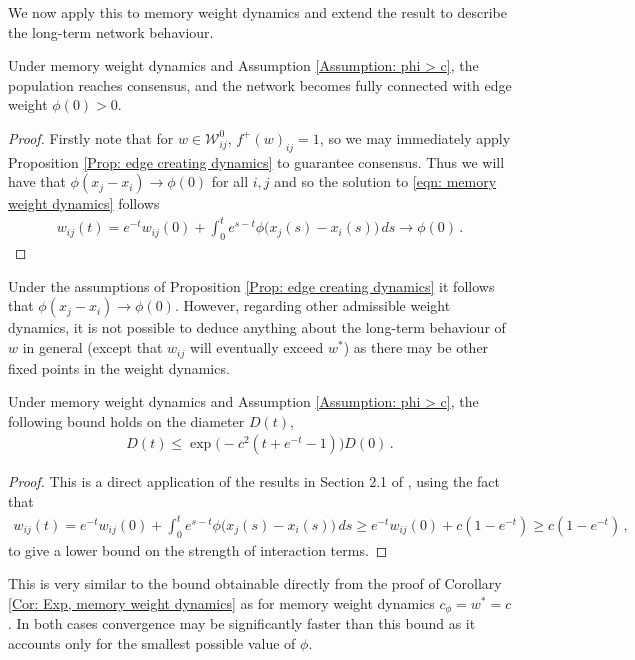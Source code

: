 \documentclass{article}
\begin{document}
We now apply this to memory weight dynamics and extend the result to describe the long-term network behaviour. 

\begin{corollary} \label{Cor: Exp, memory weight dynamics}
    Under memory weight dynamics and Assumption \ref{Assumption: phi > c}, the population reaches consensus, and the network becomes fully connected with edge weight $\phi(0)>0$.  
\end{corollary}
\begin{proof}
    Firstly note that for $w \in \mathcal{W}_{ij}^0$, $f^+(w)_{ij} = 1$, so we may immediately apply Proposition \ref{Prop: edge creating dynamics} to guarantee consensus. Thus we will have that $\phi(x_j - x_i) \rightarrow \phi(0)$ for all $i,j$ and so the solution to \eqref{eqn: memory weight dynamics} follows
    \begin{align*}
        w_{ij}(t) = e^{-t} w_{ij}(0) + \int_0^t e^{s-t} \phi\big( x_j(s) - x_i(s) \big) \, ds \rightarrow \phi(0) \,.
    \end{align*}
\end{proof}

\begin{remark}
    Under the assumptions of Proposition \ref{Prop: edge creating dynamics} it follows that $\phi(x_j - x_i)\rightarrow \phi(0)$. However, regarding other admissible weight dynamics, it is not possible to deduce anything about the long-term behaviour of $w$ in general (except that $w_{ij}$ will eventually exceed $w^*$) as there may be other fixed points in the weight dynamics. 
\end{remark}

\begin{proposition}
    Under memory weight dynamics and Assumption \ref{Assumption: phi > c}, the following bound holds on the diameter $D(t)$, 
    \begin{align*}
        D(t) \leq \exp\Big( - c^2 (t + e^{-t} - 1) \Big) D(0) \,.
    \end{align*}
\end{proposition}
\begin{proof}
    This is a direct application of the results in Section 2.1 of \cite{motsch_heterophilious_2014}, using the fact that 
    \begin{align*}
        w_{ij}(t) = e^{-t} w_{ij}(0) + \int_0^t e^{s-t} \phi\big( x_j(s) - x_i(s) \big) \, ds \geq e^{-t} w_{ij}(0) + c(1 -e^{-t}) \geq c(1 -e^{-t})\,,
    \end{align*}
    to give a lower bound on the strength of interaction terms. 
\end{proof}
This is very similar to the bound obtainable directly from the proof of Corollary \ref{Cor: Exp, memory weight dynamics} as for memory weight dynamics $c_\phi = w^* = c$. In both cases convergence may be significantly faster than this bound as it accounts only for the smallest possible value of $\phi$. 
\end{document}
